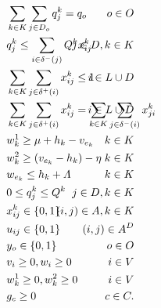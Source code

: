 \documentclass[authoryear,preprint,review,11pt]{elsarticle}
\begin{document}
{\begin{alignat}{3}
    \label{mod:c24}        & \sum_{k \in K}\sum_{j \in D_o}{q^k_j} = q_o            & \hspace{-40mm}  o \in O  \text{ }           \\
    \label{mod:c240}       & q^k_j \leq \sum_{i \in  \delta^{-}(j)}{Q^k x^k_{ij}}   & \hspace{-40mm}  j \in D, k \in K  \text{ }                                              \\
    \label{mod:c25}        & \sum_{k \in K}\sum_{j \in \delta^{+}(i)}{x^{k}_{ij} \leq 1}     & \hspace{-40mm} i \in L \cup D       \text{ }          \\
    \label{mod:c26}        & \sum_{k \in K}\sum_{j \in \delta^{+}(i)} {x^{k}_{ij} } =  \sum_{k \in K}\sum_{j \in \delta^{-}(i)}{x^{k}_{ji} }        & \hspace{-40mm}  i \in L \cup D  \text{ }       \\
    \label{mod:c29}        & w^1_k \geq  \mu + h_k - v_{e_k}            & \hspace{-40mm} k \in K   \text{ }         \\
    \label{mod:c30}        & w^2_k \geq (v_{e_k} - h_k) - \eta   & \hspace{-40mm} k \in K         \text{ }         \\
    \label{mod:c31}   & w_{e_k} \leq h_k + \varLambda  & \hspace{-20mm}  k \in K \hspace{0mm}       \text{ }                                            \\
    \label{mod:c32}        & 0 \leq q^k_j \leq Q^k   & \hspace{-40mm}  j \in D, k \in K      \text{ }                                                   \\
    \label{mod:c33}        & x^k_{ij} \in \{0,1\}      & \hspace{-40mm}  (i,j) \in A , k \in K   \text{ }                                            \\
    \label{mod:c34}        & u_{ij} \in \{0,1\}     & \hspace{-40mm}  (i,j) \in A^D \hspace{0mm}   \text{ }                                           \\
    \label{mod:c36}        & y_o \in \{0,1\}     & \hspace{-20mm}  o \in O            \text{ }                     \\
    \label{mod:c37}        & v_i \geq 0,  w_i \geq 0     & \hspace{-20mm}  i \in V         \text{ }                \\
    \label{mod:c38}        & w^1_{k} \geq 0,  w^2_k \geq 0  & \hspace{-20mm}  i \in V         \text{ }        \\
    \label{mod:cend}       & g_c \geq 0    & \hspace{-20mm}  c \in C.  \text{ }
\end{alignat}
}
\end{document}
